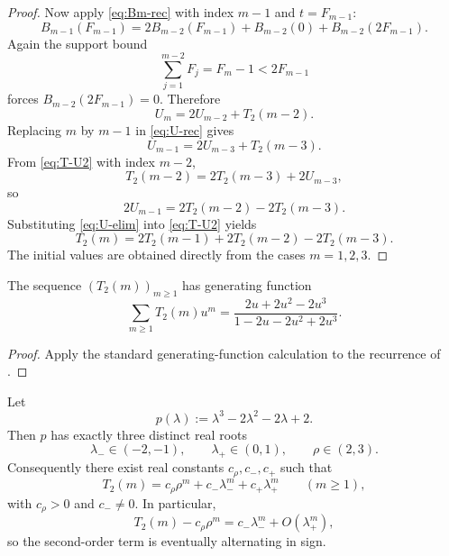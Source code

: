 \begin{proof}
Now apply \eqref{eq:Bm-rec} with index \(m-1\) and \(t=F_{m-1}\):
\[
  B_{m-1}(F_{m-1})
  =
  2B_{m-2}(F_{m-1})
  +B_{m-2}(0)
  +B_{m-2}(2F_{m-1}).
\]
Again the support bound
\[
  \sum_{j=1}^{m-2}F_j=F_m-1<2F_{m-1}
\]
forces \(B_{m-2}(2F_{m-1})=0\).  Therefore
\begin{equation}\label{eq:U-rec}
  U_m=2U_{m-2}+T_2(m-2).
\end{equation}
Replacing \(m\) by \(m-1\) in \eqref{eq:U-rec} gives
\[
  U_{m-1}=2U_{m-3}+T_2(m-3).
\]
From \eqref{eq:T-U2} with index \(m-2\),
\[
  T_2(m-2)=2T_2(m-3)+2U_{m-3},
\]
so
\begin{equation}\label{eq:U-elim}
  2U_{m-1}=2T_2(m-2)-2T_2(m-3).
\end{equation}
Substituting \eqref{eq:U-elim} into \eqref{eq:T-U2} yields
\[
  T_2(m)=2T_2(m-1)+2T_2(m-2)-2T_2(m-3).
\]
The initial values are obtained directly from the cases \(m=1,2,3\).
\end{proof}

\begin{corollary}
\label{cor:sigma-generating}
The sequence \((T_2(m))_{m\ge 1}\) has generating function
\[
  \sum_{m\ge 1}T_2(m)u^m
  =
  \frac{2u+2u^2-2u^3}{1-2u-2u^2+2u^3}.
\]
\end{corollary}

\begin{proof}
Apply the standard generating-function calculation to the recurrence of
.
\end{proof}

\begin{theorem}
\label{thm:q2-alternating-second-order}
Let
\[
  p(\lambda):=\lambda^3-2\lambda^2-2\lambda+2.
\]
Then \(p\) has exactly three distinct real roots
\[
  \lambda_-\in(-2,-1),
  \qquad
  \lambda_+\in(0,1),
  \qquad
  \rho\in(2,3).
\]
Consequently there exist real constants \(c_\rho,c_-,c_+\) such that
\[
  T_2(m)=c_\rho\rho^m+c_-\lambda_-^m+c_+\lambda_+^m
  \qquad (m\ge 1),
\]
with \(c_\rho>0\) and \(c_-\neq 0\).  In particular,
\[
  T_2(m)-c_\rho\rho^m
  =
  c_-\lambda_-^m+O(\lambda_+^m),
\]
so the second-order term is eventually alternating in sign.
\end{theorem}

